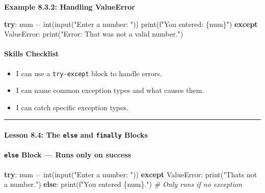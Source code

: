 \documentclass[
  justified,
  openright,
]{tufte-book}
\let\subsection\paragraph
\let\paragraph\paragraph
\newcommand{\KeywordTok}[1]{\textcolor{CodeKeyword}{\textbf{#1}}}  %
\newcommand{\StringTok}[1]{\textcolor{CodeString}{#1}}              %
\newcommand{\CommentTok}[1]{\textcolor{CodeComment}{\textit{#1}}}  %
\newcommand{\CodeAccentTok}[1]{\textcolor{CodeAccent}{#1}}          %
\newcommand{\OperatorTok}[1]{\textcolor{DarkGray}{#1}}              %
\newenvironment{Shaded}{%
  \begin{mdframed}[style=TufteCode]%
}{%
  \end{mdframed}%
}
\let\subsection\paragraph
\let\paragraph\paragraph
\providecommand{\tightlist}{%
  \setlength{\itemsep}{0pt}\setlength{\parskip}{0pt}}
\begin{document}
\textbf{Example 8.3.2: Handling ValueError}

\begin{Shaded}
\begin{Highlighting}[]
\KeywordTok{try}:
    num \OperatorTok{=} int(input(\StringTok{"Enter a number: "}))
    print(\StringTok{f"You entered: }\StringTok{\{}num\StringTok{\}}\StringTok{"})
\KeywordTok{except} \CodeAccentTok{ValueError}:
    print(\StringTok{"Error: That was not a valid number."})
\end{Highlighting}
\end{Shaded}

\subsection{Skills Checklist}\label{skills-checklist-39}

\begin{itemize}
\tightlist
\item[$\square$]
  I can use a \texttt{try-except} block to handle errors.
\item[$\square$]
  I can name common exception types and what causes them.
\item[$\square$]
  I can catch specific exception types.
\end{itemize}

\begin{center}\rule{0.5\linewidth}{0.5pt}\end{center}

\subsection{\texorpdfstring{Lesson 8.4: The \texttt{else} and
\texttt{finally}
Blocks}{Lesson 8.4: The else and finally Blocks}}\label{lesson-8.4-the-else-and-finally-blocks}

\subsection{\texorpdfstring{\texttt{else} Block --- Runs only on
success}{else Block --- Runs only on success}}\label{else-block-runs-only-on-success}

\begin{Shaded}
\begin{Highlighting}[]
\KeywordTok{try}:
    num \OperatorTok{=} int(input(\StringTok{"Enter a number: "}))
\KeywordTok{except} \CodeAccentTok{ValueError}:
    print(\StringTok{"That\textquotesingle{}s not a number."})
\KeywordTok{else}:
    print(\StringTok{f"You entered }\StringTok{\{}num\StringTok{\}}\StringTok{."})   \CommentTok{\# Only runs if no exception}
\end{Highlighting}
\end{Shaded}
\end{document}
